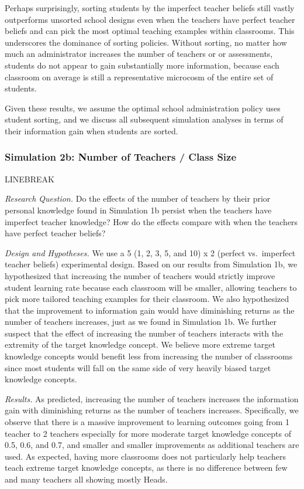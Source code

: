 \documentclass[10pt, letterpaper]{apa6}
\begin{document}
Perhaps surprisingly, sorting students by the imperfect teacher beliefs
still vastly outperforms unsorted school designs even when the teachers
have perfect teacher beliefs and can pick the most optimal teaching
examples within classrooms. This underscores the dominance of sorting
policies. Without sorting, no matter how much an administrator increases
the number of teachers or or assessments, students do not appear to gain
substantially more information, because each classroom on average is
still a representative microcosm of the entire set of students.

Given these results, we assume the optimal school administration policy
uses student sorting, and we discuss all subsequent simulation analyses
in terms of their information gain when students are sorted.

\subsubsection{Simulation 2b: Number of Teachers / Class
Size}\label{simulation-2b-number-of-teachers-class-size}

LINEBREAK

\emph{Research Question. } Do the effects of the number of teachers by
their prior personal knowledge found in Simulation 1b persist when the
teachers have imperfect teacher knowledge? How do the effects compare
with when the teachers have perfect teacher beliefs?

\emph{Design and Hypotheses. } We use a 5 (1, 2, 3, 5, and 10) x 2
(perfect vs.~imperfect teacher beliefs) experimental design. Based on
our results from Simulation 1b, we hypothesized that increasing the
number of teachers would strictly improve student learning rate because
each classroom will be smaller, allowing teachers to pick more tailored
teaching examples for their classroom. We also hypothesized that the
improvement to information gain would have diminishing returns as the
number of teachers increases, just as we found in Simulation 1b. We
further suspect that the effect of increasing the number of teachers
interacts with the extremity of the target knowledge concept. We believe
more extreme target knowledge concepts would benefit less from
increasing the number of classrooms since most students will fall on the
same side of very heavily biased target knowledge concepts.

\emph{Results. } As predicted, increasing the number of teachers
increases the information gain with diminishing returns as the number of
teachers increases. Specifically, we observe that there is a massive
improvement to learning outcomes going from 1 teacher to 2 teachers
especially for more moderate target knowledge concepts of 0.5, 0.6, and
0.7, and smaller and smaller improvements as additional teachers are
used. As expected, having more classrooms does not particularly help
teachers teach extreme target knowledge concepts, as there is no
difference between few and many teachers all showing mostly Heads.
\end{document}

